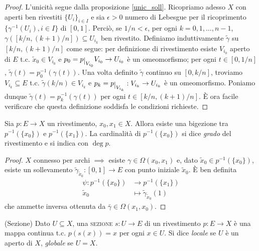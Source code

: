 \begin{proof}
  L'unicità segue dalla proposizione \ref{unic_soll}. Ricopriamo adesso $X$ con aperti ben rivestiti $\{U_i\}_{i \in I}$ e sia $\epsilon>0$ numero di Lebesgue per il ricoprimento $\{\gamma^{-1}(U_i), i \in I\}$ di $[0, 1]$.
  Perciò, se $1/n < \epsilon$, per ogni $k=0, 1, \dots, n-1$, $\gamma([k/n, (k+1)/n]) \subseteq U_{i_k}$ ben rivestito.
  Definiamo induttivamente $\tilde{\gamma}$ su $[k/n, (k+1)/n]$ come segue: per definizione di rivestimento esiste $V_{i_0}$ aperto di $E$ t.c. $\tilde{x}_0 \in V_{i_0}$ e $p_0=p \restrict{V_{i_0}} V_{i_0} \rightarrow U_{i_0}$ è un omeomorfismo;
  per ogni $t \in [0, 1/n]$, $\tilde{\gamma}(t)=p_0^{-1}(\gamma(t))$. Una volta definito $\tilde{\gamma}$ continuo su $[0, k/n]$, troviamo $V_{i_k} \subseteq E$ t.c. $\tilde{\gamma}(k/n) \in V_{i_k}$ e $p_k=p \restrict{V_{i_k}}: V_{i_k} \rightarrow U_{i_k}$ è un omeomorfismo.
  Poniamo dunque $\tilde{\gamma}(t)=p_k^{-1}(\gamma(t))$ per ogni $t \in [k/n, (k+1)/n]$. È ora facile verificare che questa definizione soddisfa le condizioni richieste.
\end{proof}

\begin{prop}
  Sia $p:E \rightarrow X$ un rivestimento, $x_0, x_1 \in X$. Allora esiste una bigezione tra $p^{-1}(\{x_0\})$ e $p^{-1}(\{x_1\})$. La cardinalità di $p^{-1}(\{x_0\})$ si dice \textit{grado} del rivestimento e si indica con $\deg{p}$.
\end{prop}

\begin{proof}
  $X$ connesso per archi $\implies$ esiste $\gamma \in \Omega(x_0, x_1)$ e, dato $\tilde{x}_0 \in p^{-1}(\{x_0\})$, esiste un sollevamento $\tilde{\gamma}_{\tilde{x}_0}: [0, 1] \rightarrow E$ con punto iniziale $\tilde{x}_0$. È ben definita
  \begin{align*}
  \psi:p^{-1}(\{x_0\}) &\longrightarrow p^{-1}(\{x_1\}) \\
  \tilde{x}_0 &\longmapsto \tilde{\gamma}_{\tilde{x}_0}(1)
  \end{align*}
  che ammette inversa ottenuta da $\bar{\gamma} \in \Omega(x_1, x_0)$.
\end{proof}

\begin{defn}
  (Sezione) Dato $U \subseteq X$, una \textsc{sezione} $s:U \rightarrow E$ di un rivestimento $p:E \rightarrow X$ è una mappa continua t.c. $p(s(x))=x$ per ogni $x \in U$. Si dice \textit{locale} se $U$ è un aperto di $X$, \textit{globale} se $U=X$.
\end{defn}

